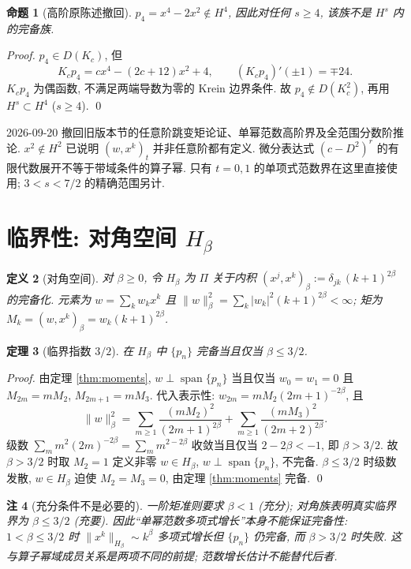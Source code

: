 \documentclass[UTF8]{ctexart}
\newtheorem{theorem}{定理}[section]
\newtheorem{proposition}[theorem]{命题}
\newtheorem{remark}[theorem]{注}
\newtheorem{definition}[theorem]{定义}
\begin{document}
\begin{proposition}[高阶原陈述撤回]
$p_4=x^4-2x^2\notin H^4$, 因此对任何 $s\ge4$, 该族不是 $H^s$ 内的完备族.
\end{proposition}
\begin{proof}
$p_4\in D(K_c)$, 但
\[
 K_cp_4=cx^4-(2c+12)x^2+4,\qquad (K_cp_4)'(\pm1)=\mp24.
\]
$K_cp_4$ 为偶函数, 不满足两端导数为零的 Krein 边界条件.
故 $p_4\notin D(K_c^2)$, 再用 $H^s\subset H^4$ ($s\ge4$). \qed
\end{proof}

2026-09-20 撤回旧版本节的任意阶跳变矩论证、单幂范数高阶界及全范围分数阶推论.
$x^2\notin H^2$ 已说明 $(w,x^k)_t$ 并非任意阶都有定义.
微分表达式 $(c-D^2)^r$ 的有限代数展开不等于带域条件的算子幂.
只有 $t=0,1$ 的单项式范数界在这里直接使用; $3<s<7/2$ 的精确范围另计.

\section{临界性: 对角空间 \texorpdfstring{$H_\beta$}{H beta}}

\begin{definition}[对角空间]
	对 $\beta \geq 0$, 令 $H_\beta$ 为 $\Pi$ 关于内积
	$(x^j, x^k)_\beta := \delta_{jk}\, (k+1)^{2\beta}$ 的完备化. 元素为
	$w = \sum_k w_k x^k$ 且 $\|w\|_\beta^2 = \sum_k |w_k|^2 (k+1)^{2\beta}
	< \infty$; 矩为 $M_k = (w, x^k)_\beta = w_k (k+1)^{2\beta}$.
\end{definition}

\begin{theorem}[临界指数 $3/2$]\label{thm:diagonal}
	在 $H_\beta$ 中 $\{p_n\}$ 完备当且仅当 $\beta \leq 3/2$.
\end{theorem}

\begin{proof}
	由定理 \ref{thm:moments}, $w \perp \operatorname{span}\{p_n\}$ 当且仅当 $w_0 = w_1 = 0$
	且 $M_{2m} = mM_2$, $M_{2m+1} = mM_3$. 代入表示性:
	$w_{2m} = mM_2 (2m+1)^{-2\beta}$, 且
	\[
		\|w\|_\beta^2 = \sum_{m \geq 1} \frac{(mM_2)^2}{(2m+1)^{2\beta}}
			+ \sum_{m \geq 1} \frac{(mM_3)^2}{(2m+2)^{2\beta}} .
	\]
	级数 $\sum_m m^2 (2m)^{-2\beta} = \sum_m m^{2-2\beta}$ 收敛当且仅当
	$2 - 2\beta < -1$, 即 $\beta > 3/2$. 故 $\beta > 3/2$ 时取 $M_2 = 1$
	定义非零 $w \in H_\beta$, $w \perp \operatorname{span}\{p_n\}$,
	不完备. $\beta \leq 3/2$ 时级数发散, $w \in H_\beta$ 迫使 $M_2 = M_3 = 0$,
	由定理 \ref{thm:moments} 完备. \qed
\end{proof}

\begin{remark}[充分条件不是必要的]
	一阶矩准则要求 $\beta < 1$ (充分); 对角族表明真实临界界为
	$\beta \leq 3/2$ (充要). 因此``单幂范数多项式增长''本身不能保证完备性:
	$1 < \beta \leq 3/2$ 时 $\|x^k\|_{H_\beta} \sim k^\beta$ 多项式增长但
	$\{p_n\}$ 仍完备, 而 $\beta > 3/2$ 时失败.
	这与算子幂域成员关系是两项不同的前提; 范数增长估计不能替代后者.
\end{remark}
\end{document}
